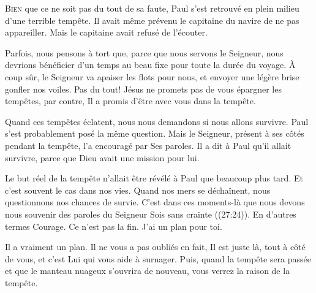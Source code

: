 


\lettrine{B}{ien} que ce ne soit pas du tout de sa faute,
 Paul s'est retrouvé en plein milieu d'une terrible tempête.
 Il avait même prévenu le capitaine du navire de ne pas appareiller.
 Mais le capitaine avait refusé de l'écouter.

Parfois, nous pensons à tort que, parce que nous servons le Seigneur,
 nous devrions bénéficier d'un temps au beau fixe pour toute la durée du voyage.
 À coup sûr, le Seigneur va apaiser les flots pour nous,
 et envoyer une légère brise gonfler nos voiles. Pas du tout!
 Jésus ne promets pas de vous épargner les tempêtes, par contre,
 Il a promis d'être avec vous dans la tempête.


Quand ces tempêtes éclatent, nous nous demandons si nous allons survivre.
 Paul s'est probablement posé la même question.
 Mais le Seigneur, présent à ses côtés pendant la tempête,
 l'a encouragé par Ses paroles.
 Il a dit à Paul qu'il allait survivre,
 parce que Dieu avait une mission pour lui.

Le but réel de la tempête n'allait être révélé à Paul que beaucoup plus tard.
 Et c'est souvent le cas dans nos vies. Quand nos mers se déchaînent,
 nous questionnons nos chances de survie.
 C'est dans ces moments-là que nous devons nous souvenir des paroles du Seigneur\frcolon{}
 \Og Sois sans crainte \Fg{} ((27:24)).
 En d'autres termes\frcolon{} 
 \Og Courage. Ce n'est pas la fin. J'ai un plan pour toi. \Fg{}

Il a vraiment un plan. Il ne vous a pas oubliés \ocadr en fait,
 Il est juste là, tout à côté de vous, et c'est Lui qui vous aide à surnager.
 Puis, quand la tempête sera passée et que le manteau nuageux s'ouvrira de nouveau,
 vous verrez la raison de la tempête.

\dvrule




